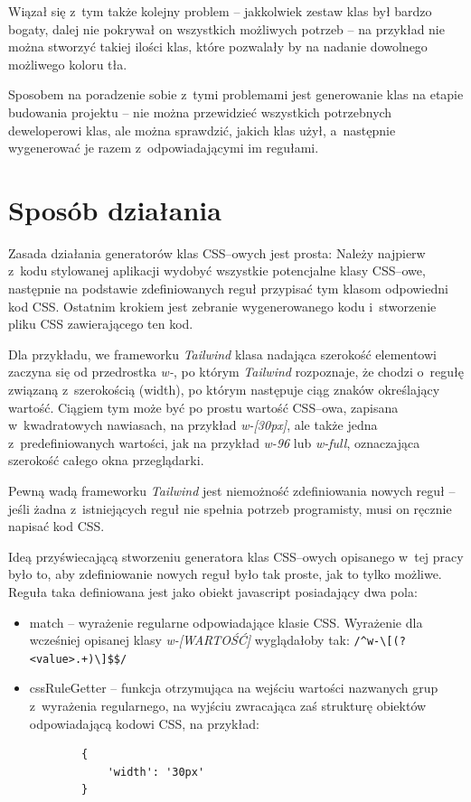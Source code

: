 \documentclass{SGGW-thesis}
\begin{document}
Wiązał się z~tym także kolejny problem -- jakkolwiek zestaw klas był bardzo bogaty, dalej nie pokrywał on wszystkich możliwych potrzeb -- na przykład nie można stworzyć takiej ilości klas, które pozwalały by na nadanie dowolnego możliwego koloru tła.

Sposobem na poradzenie sobie z~tymi problemami jest generowanie klas na etapie budowania projektu -- nie można przewidzieć wszystkich potrzebnych deweloperowi klas, ale można sprawdzić, jakich klas użył, a~następnie wygenerować je razem z~odpowiadającymi im regułami.


\section{Sposób działania}
Zasada działania generatorów klas CSS--owych jest prosta: Należy najpierw z~kodu stylowanej aplikacji wydobyć wszystkie potencjalne klasy CSS--owe, następnie na podstawie zdefiniowanych reguł przypisać tym klasom odpowiedni kod CSS. Ostatnim krokiem jest zebranie wygenerowanego kodu i~stworzenie pliku CSS zawierającego ten kod.

Dla przykładu, we frameworku \emph{Tailwind} klasa nadająca szerokość elementowi zaczyna się od przedrostka \emph{w-}, po którym \emph{Tailwind} rozpoznaje, że chodzi o~regułę związaną z~szerokością (width), po którym następuje ciąg znaków określający wartość. Ciągiem tym może być po prostu wartość CSS--owa, zapisana w~kwadratowych nawiasach, na przykład \emph{w-[30px]}, ale także jedna z~predefiniowanych wartości, jak na przykład \emph{w-96} lub \emph{w-full}, oznaczająca szerokość całego okna przeglądarki\cite{Tailwind_jit}.

Pewną wadą frameworku \emph{Tailwind} jest niemożność zdefiniowania nowych reguł -- jeśli żadna z~istniejących reguł nie spełnia potrzeb programisty, musi on ręcznie napisać kod CSS.

Ideą przyświecającą stworzeniu generatora klas CSS--owych opisanego w~tej pracy było to, aby zdefiniowanie nowych reguł było tak proste, jak to tylko możliwe. Reguła taka definiowana jest jako obiekt javascript posiadający dwa pola:
\begin{itemize}
    \item match -- wyrażenie regularne odpowiadające klasie CSS. Wyrażenie dla wcześniej opisanej klasy \emph{w-[WARTOŚĆ]} wyglądałoby tak: \verb|/^w-\[(?<value>.+)\]$$/|
    \item cssRuleGetter -- funkcja otrzymująca na wejściu wartości nazwanych grup z~wyrażenia regularnego, na wyjściu zwracająca zaś strukturę obiektów odpowiadającą kodowi CSS, na przykład:
    \begin{verbatim}
        {
            'width': '30px'
        }
    \end{verbatim}
\end{itemize}
\end{document}
